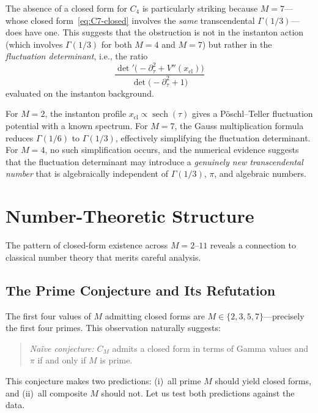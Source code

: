 \documentclass[12pt,a4paper]{article}
\numberwithin{equation}{section}
\theoremstyle{plain}
\theoremstyle{definition}
\theoremstyle{remark}
\begin{document}
The absence of a closed form for $C_4$ is particularly striking because
$M = 7$---whose closed form~\eqref{eq:C7-closed} involves the \emph{same}
transcendental $\Gamma(1/3)$---does have one. This suggests that the
obstruction is not in the instanton action (which involves $\Gamma(1/3)$
for both $M = 4$ and $M = 7$) but rather in the \emph{fluctuation
determinant}, i.e., the ratio
\begin{equation}\label{eq:fluct-det}
  \frac{\det'\!\bigl(-\partial_\tau^2 + V''(x_{\mathrm{cl}})\bigr)}
       {\det\bigl(-\partial_\tau^2 + 1\bigr)}
\end{equation}
evaluated on the instanton background.

For $M = 2$, the instanton profile $x_{\mathrm{cl}} \propto \operatorname{sech}(\tau)$
gives a P\"oschl--Teller fluctuation potential with a known spectrum. For
$M = 7$, the Gauss multiplication formula reduces $\Gamma(1/6)$ to
$\Gamma(1/3)$, effectively simplifying the fluctuation determinant.
For $M = 4$, no such simplification occurs, and the numerical evidence
suggests that the fluctuation determinant may introduce a \emph{genuinely
new transcendental number} that is algebraically independent of
$\Gamma(1/3)$, $\pi$, and algebraic numbers.

\section{Number-Theoretic Structure}
\label{sec:number-theory}

The pattern of closed-form existence across $M = 2$--$11$ reveals a
connection to classical number theory that merits careful analysis.

\subsection{The Prime Conjecture and Its Refutation}
\label{sec:prime-conjecture}

The first four values of $M$ admitting closed forms are
$M \in \{2, 3, 5, 7\}$---precisely the first four primes. This
observation naturally suggests:

\begin{quote}
\textit{Na\"ive conjecture:} $C_M$ admits a closed form in terms of Gamma
values and $\pi$ if and only if $M$ is prime.
\end{quote}

This conjecture makes two predictions: (i)~all prime $M$ should yield
closed forms, and (ii)~all composite $M$ should not. Let us test both
predictions against the data.
\end{document}
